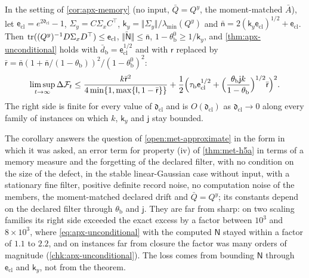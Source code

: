 \begin{corollary}\label{cor:apx-unconditional-memory}
In the setting of \cref{cor:apx-memory} (no input, $\bar Q=Q^y$, the moment-matched $\bar A$), let $\mathsf e_{\mathrm{cl}}=e^{2\mathfrak d_{\mathrm{cl}}}-1$, $\Sigma_y=C\Sigma_xC^\top$, $\mathsf k_y=\Vert\Sigma_y\Vert/\lambda_{\min}(Q^y)$ and $\bar{\mathsf n}=2(\mathsf k_y\mathsf e_{\mathrm{cl}})^{1/2}+\mathsf e_{\mathrm{cl}}$. Then $\operatorname{tr}((Q^y)^{-1}D\Sigma_xD^\top)\le\mathsf e_{\mathrm{cl}}$, $\Vert\tilde{\mathsf N}\Vert\le\bar{\mathsf n}$, $1-\theta^0_{\mathrm b}\ge1/\mathsf k_y$, and \cref{thm:apx-unconditional} holds with $\bar d_{\mathrm b}=\mathsf e_{\mathrm{cl}}^{1/2}$ and with $\mathsf r$ replaced by $\bar{\mathsf r}=\bar{\mathsf n}(1+\bar{\mathsf n}/(1-\theta_{\mathrm b}))^2/(1-\theta^0_{\mathrm b})^2$:
\begin{equation}\label{eq:apx-unconditional-memory}
\limsup_{t\to\infty}\Delta\mathcal F_t\le\frac{k\bar{\mathsf r}^2}{4\min\{1,\max\{\mathsf l,1-\bar{\mathsf r}\}\}}+\frac12\Bigl(\tau_{\mathrm b}\mathsf e_{\mathrm{cl}}^{1/2}+\Bigl(\frac{\theta_{\mathrm b}\mathsf jk}{1-\theta_{\mathrm b}}\Bigr)^{1/2}\bar{\mathsf r}\Bigr)^2 .
\end{equation}
The right side is finite for every value of $\mathfrak d_{\mathrm{cl}}$ and is $O(\mathfrak d_{\mathrm{cl}})$ as $\mathfrak d_{\mathrm{cl}}\to0$ along every family of instances on which $k$, $\mathsf k_y$ and $\mathsf j$ stay bounded.
\end{corollary}

The corollary answers the question of \cref{open:met-approximate} in the form in which it was asked, an error term for property (iv) of \cref{thm:met-h5a} in terms of a memory measure and the forgetting of the declared filter, with no condition on the size of the defect, in the stable linear-Gaussian case without input, with a stationary fine filter, positive definite record noise, no computation noise of the members, the moment-matched declared drift and $\bar Q=Q^y$; its constants depend on the declared filter through $\theta_{\mathrm b}$ and $\mathsf j$. They are far from sharp: on two scaling families its right side exceeded the exact excess by a factor between $10^3$ and $8\times10^3$, where \cref{eq:apx-unconditional} with the computed $\mathsf N$ stayed within a factor of $1.1$ to $2.2$, and on instances far from closure the factor was many orders of magnitude (\cref{chk:apx-unconditional}). The loss comes from bounding $\mathsf N$ through $\mathsf e_{\mathrm{cl}}$ and $\mathsf k_y$, not from the theorem.

